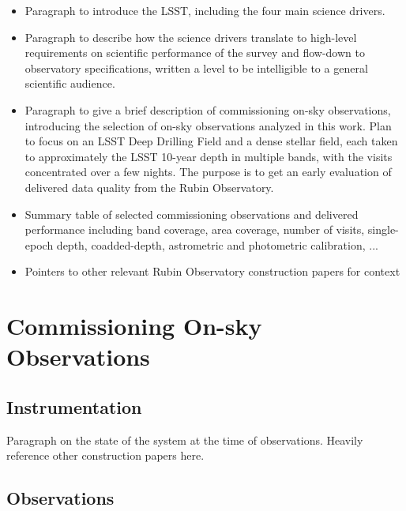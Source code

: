 \begin{itemize}

\item Paragraph to introduce the LSST, including the four main science drivers.

\item Paragraph to describe how the science drivers translate to high-level requirements on scientific performance of the survey and flow-down to observatory specifications, written a level to be intelligible to a general scientific audience. 

\item Paragraph to give a brief description of commissioning on-sky observations, introducing the selection of on-sky observations analyzed in this work. 
Plan to focus on an LSST Deep Drilling Field and a dense stellar field, each taken to approximately the LSST 10-year depth in multiple bands, with the visits concentrated over a few nights. 
The purpose is to get an early evaluation of delivered data quality from the Rubin Observatory.

\item Summary table of selected commissioning observations and delivered performance including band coverage, area coverage, number of visits, single-epoch depth, coadded-depth, astrometric and photometric calibration, ...

\item Pointers to other relevant Rubin Observatory construction papers for context

\end{itemize}

\section{Commissioning On-sky Observations}

\subsection{Instrumentation}

Paragraph on the state of the system at the time of observations.
Heavily reference other construction papers here.

\subsection{Observations}

